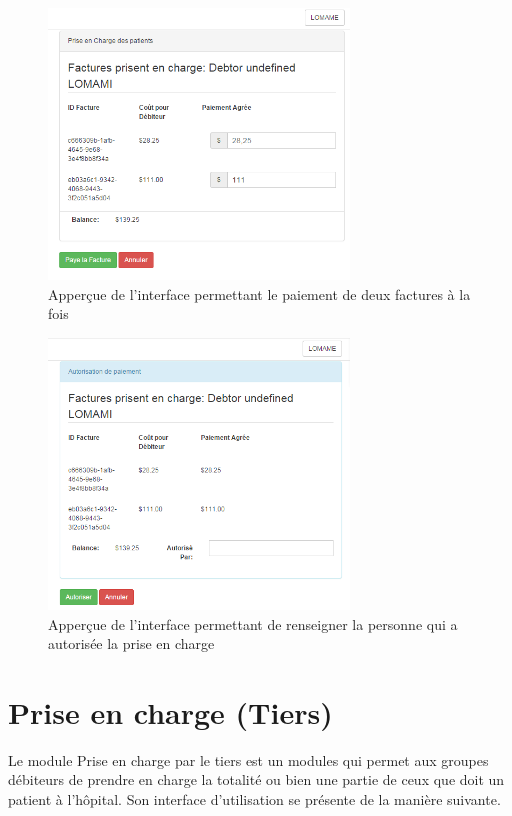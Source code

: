 \documentclass[12pt,a4paper]{report}
\begin{document}
\newpage

\begin{figure}[h]
\begin{center}
\includegraphics[width=8cm]{pic/DoubleSupport.png}
\end{center}
\caption{Apperçue de l'interface permettant le paiement de deux factures à la fois}
\label{Apperçue de l'interface permettant le paiement de deux factures à la fois}
\end{figure}


\begin{figure}[h]
\begin{center}
\includegraphics[width=8cm]{pic/AutPrCharge.png}
\end{center}
\caption{Apperçue de l'interface permettant de renseigner la personne qui a autorisée la prise en charge}
\label{Apperçue de l'interface permettant de renseigner la personne qui a autorisée la prise en charge}
\end{figure}


\newpage
\section{ Prise en charge (Tiers)}
Le module  Prise en charge par le tiers est un modules qui permet aux groupes débiteurs de prendre en charge la totalité ou bien une partie de ceux que doit un patient à l'hôpital. Son interface d'utilisation se présente de la manière suivante.
\end{document}
